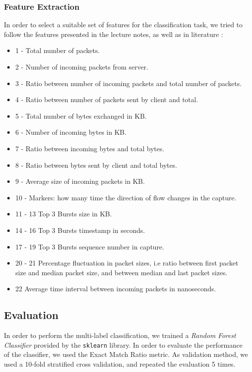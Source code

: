 \documentclass[10pt,conference,compsocconf]{IEEEtran}
\begin{document}
\subsubsection{Feature Extraction}
In order to select a suitable set of features for the classification task, we tried to follow the features presented in the lecture notes, as well as in literature \cite{web_fingerprinting}:
\begin{itemize}
    \item 1 - Total number of packets.
    \item 2 - Number of incoming packets from server.
    \item 3 - Ratio between number of incoming packets and total number of packets.
    \item 4 - Ratio between number of packets sent by client and total.
    \item 5 - Total number of bytes exchanged in KB.
    \item 6 - Number of incoming bytes in KB.
    \item 7 - Ratio between incoming bytes and total bytes.
    \item 8 - Ratio between bytes sent by client and total bytes.
    \item 9 - Average size of incoming packets in KB.
    \item 10 - Markers: how many time the direction of flow changes in the capture.
    \item 11 - 13 Top 3 Bursts size in KB.
    \item 14 - 16 Top 3 Bursts timestamp in seconds.
    \item 17 - 19 Top 3 Bursts sequence number in capture.
    \item 20 - 21 Percentage fluctuation in packet sizes, i.e ratio between first packet size and median packet size, and between median and last packet sizes.
    \item 22 Average time interval between incoming packets in nanoseconds.
\end{itemize}
\subsection{Evaluation}
In order to perform the multi-label classification, we trained a \textit{Random Forest Classifier} provided by the \texttt{sklearn} library. In order to evaluate the performance of the classifier, we used the Exact Match Ratio metric. As validation method, we used a 10-fold stratified cross validation, and repeated the evaluation 5 times.
\end{document}

